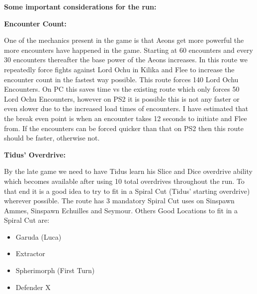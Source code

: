 \vspace{\baselineskip}

\textbf{\Large Some important considerations for the run:}

\vspace{\baselineskip}

\textbf{\large Encounter Count:}

One of the mechanics present in the game is that Aeons get more powerful the more encounters have happened in the game. Starting at 60 encounters and every 30 encounters thereafter the base power of the Aeons increases. In this route we repeatedly force fights against Lord Ochu in Kilika and Flee to increase the encounter count in the fastest way possible. This route forces 140 Lord Ochu Encounters. On PC this saves time vs the existing route which only forces 50 Lord Ochu Encounters, however on PS2 it is possible this is not any faster or even slower due to the increased load times of encounters. I have estimated that the break even point is when an encounter takes 12 seconds to initiate and Flee from. If the encounters can be forced quicker than that on PS2 then this route should be faster, otherwise not.

\vspace{\baselineskip}

\textbf{\large Tidus' Overdrive:}

\vspace{\baselineskip}

By the late game we need to have Tidus learn his Slice and Dice overdrive ability which becomes available after using 10 total overdrives throughout the run. To that end it is a good idea to try to fit in a Spiral Cut (Tidus' starting overdrive) wherever possible. The route has 3 mandatory Spiral Cut uses on Sinspawn Ammes, Sinspawn Echuilles and Seymour. Others Good Locations to fit in a Spiral Cut are:

\vspace{\baselineskip}

\begin{itemize}

	\item Garuda (Luca)
	\item Extractor
	\item Spherimorph (First Turn)
	\item Defender X

\end{itemize}

\vspace{\baselineskip}
	
